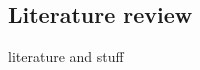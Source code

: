 \hypertarget{literature-review}{%
\subsection{Literature review}\label{literature-review}}

literature and stuff
